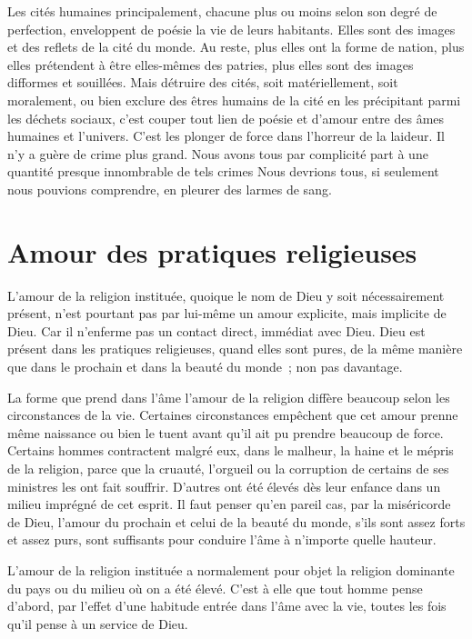 \documentclass[french,twoside]{book} %
\begin{document}
Les cités humaines principalement, chacune plus ou moins selon son degré de perfection, enveloppent de poésie la vie de leurs habitants. Elles sont des images et des reflets de la cité du monde. Au reste, plus elles ont la forme de nation, plus elles prétendent à être elles-mêmes des patries, plus elles sont des images difformes et souillées. Mais détruire des cités, soit matériellement, soit moralement, ou bien exclure des êtres humains de la cité en les précipitant parmi les déchets sociaux, c'est couper tout lien de poésie et d'amour entre des âmes humaines et l'univers. C'est les plonger de force dans l'horreur de la laideur. Il n'y a guère de crime plus grand. Nous avons tous par complicité part à une quantité presque innombrable de tels crimes Nous devrions tous, si seulement nous pouvions comprendre, en pleurer des larmes de sang.
\section[Amour des pratiques religieuses]{Amour des pratiques religieuses}
\noindent L'amour de la religion instituée, quoique le nom de Dieu y soit nécessairement présent, n'est pourtant pas par lui-même un amour explicite, mais implicite de Dieu. Car il n'enferme pas un contact direct, immédiat avec Dieu. Dieu est présent dans les pratiques religieuses, quand elles sont pures, de la même manière que dans le prochain et dans la beauté du monde ; non pas davantage.\par
La forme que prend dans l'âme l'amour de la religion diffère beaucoup selon les circonstances de la vie. Certaines circonstances empêchent que cet amour prenne même naissance ou bien le tuent avant qu'il ait pu prendre beaucoup de force. Certains hommes contractent malgré eux, dans le malheur, la haine et le mépris de la religion, parce que la cruauté, l'orgueil ou la corruption de certains de ses ministres les ont fait souffrir. D'autres ont été élevés dès leur enfance dans un milieu imprégné de cet esprit. Il faut penser qu'en pareil cas, par la miséricorde de Dieu, l'amour du prochain et celui de la beauté du monde, s'ils sont assez forts et assez purs, sont suffisants pour conduire l'âme à n'importe quelle hauteur.\par
L'amour de la religion instituée a normalement pour objet la religion dominante du pays ou du milieu où on a été élevé. C'est à elle que tout homme pense d'abord, par l'effet d'une habitude entrée dans l'âme avec la vie, toutes les fois qu'il pense à un service de Dieu.\par
\end{document}

